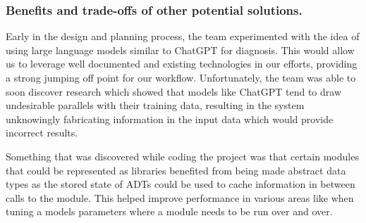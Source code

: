 \documentclass[12pt, titlepage]{article}
\begin{document}
\subsubsection{Benefits and trade-offs of other potential solutions.}
Early in the design and planning process, the team experimented with the idea of using large language models similar to ChatGPT for diagnosis. This would allow us to leverage well documented and existing technologies in our efforts, providing a strong jumping off point for our workflow. Unfortunately, the team was able to soon discover research which showed that models like ChatGPT tend to draw undesirable parallels with their training data, resulting in the system unknowingly fabricating information in the input data which would provide incorrect results.

Something that was discovered while coding the project was that certain modules that could be represented as libraries benefited from being made abstract data types as the stored state of ADTs could be used to cache information in between calls to the module. This helped improve performance in various areas like when tuning a models parameters where a module needs to be run over and over.
\end{document}
